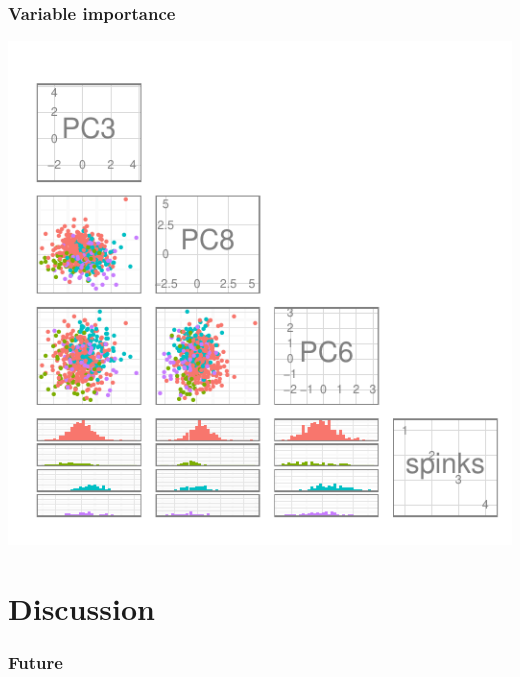 \documentclass{beamer}\usepackage{graphicx, color}
\makeatletter
\def\maxwidth{ %
  \ifdim\Gin@nat@width>\linewidth
    \linewidth
  \else
    \Gin@nat@width
  \fi
}
\newenvironment{knitrout}{}{} %
\makeatother
\begin{document}
\begin{frame}[fragile]
  \frametitle{Variable importance}
\begin{knitrout}
\color{fgcolor}
\includegraphics[width=\maxwidth]{figure/imp} 

\end{knitrout}

\end{frame}

\section{Discussion}
\begin{frame}
  \frametitle{Future}
\end{frame}
\end{document}
